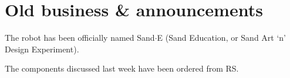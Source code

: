 \documentclass[a4paper,11pt,twoside,class=meetingmins,crop=false]{standalone}
\begin{document}

\maketitle
{}

\section{Old business \& announcements}
\begin{items}
    \item \priormins
    \item The robot has been officially named Sand$\cdot$E (Sand Education, or Sand Art `n' Design Experiment).
    \item The components discussed last week have been ordered from RS.
\end{items}
\end{document}
